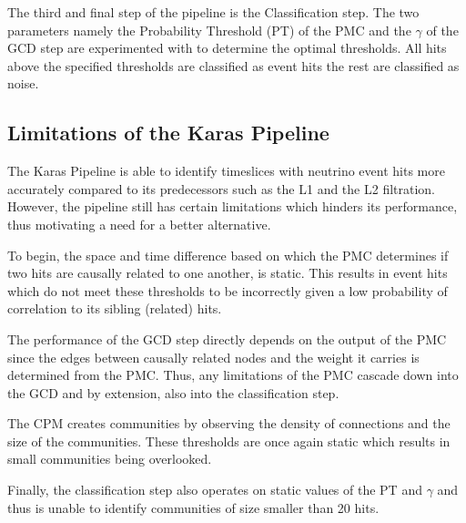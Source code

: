 The third and final step of the pipeline is the Classification step. The two
parameters namely the Probability Threshold (PT) of the PMC and the $\gamma$
of the GCD step are experimented with to determine the optimal thresholds. All
hits above the specified thresholds are classified as event hits the rest are
classified as noise.

\subsection{Limitations of the Karas Pipeline}
\label{sec:karas-pipeline-limitations}



The Karas Pipeline is able to identify timeslices with neutrino event
hits more accurately compared to its predecessors such as the L1 and
the L2 filtration. However, the pipeline still has certain limitations
which hinders its performance, thus motivating a need for a better
alternative.

To begin, the space and time difference based on which the PMC
determines if two hits are causally related to one another, is static.
This results in event hits which do not meet these thresholds to be
incorrectly given a low probability of correlation to its sibling
(related) hits.

The performance of the GCD step directly depends on the output of the
PMC since the edges between causally related nodes and the weight it
carries is determined from the PMC. Thus, any limitations of the PMC
cascade down into the GCD and by extension, also into the
classification step.


The CPM creates communities by observing the density of connections
and the size of the communities. These thresholds are once again
static which results in small communities being overlooked.

Finally, the classification step also operates on static values of the
PT and $\gamma$ and thus is unable to identify communities of size
smaller than 20 hits.
